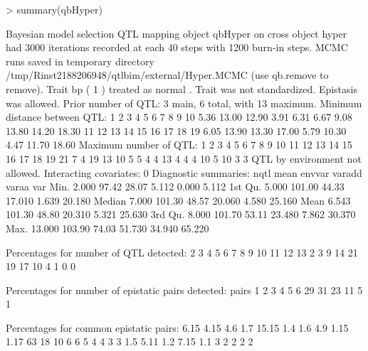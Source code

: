 \documentclass{article}
\begin{document}
\begin{Schunk}
\begin{Sinput}
> summary(qbHyper)
\end{Sinput}
\begin{Soutput}
Bayesian model selection QTL mapping object qbHyper on cross object hyper 
had 3000 iterations recorded at each 40 steps
with 1200 burn-in steps.
MCMC runs saved in temporary directory
 /tmp/Rinst2188206948/qtlbim/external/Hyper.MCMC 
(use qb.remove to remove).
Trait bp ( 1 ) treated as normal .
Trait was not standardized.
Epistasis was allowed.
Prior number of QTL: 3 main, 6 total, with 13 maximum.
Minimum distance between QTL:
    1     2     3     4     5     6     7     8     9    10 
 5.36 13.00 12.90  3.91  6.31  6.67  9.08 13.80 14.20 18.30 
   11    12    13    14    15    16    17    18    19 
 6.05 13.90 13.30 17.00  5.79 10.30  4.47 11.70 18.60 
Maximum number of QTL:
 1  2  3  4  5  6  7  8  9 10 11 12 13 14 15 16 17 18 19 
21  7  4 19 13 10  5  5  4  4 13  4  4  4 10  5 10  3  3 
QTL by environment not allowed.
Interacting covariates: 0
Diagnostic summaries:
          nqtl   mean envvar varadd  varaa    var
Min.     2.000  97.42  28.07  5.112  0.000  5.112
1st Qu.  5.000 101.00  44.33 17.010  1.639 20.180
Median   7.000 101.30  48.57 20.060  4.580 25.160
Mean     6.543 101.30  48.80 20.310  5.321 25.630
3rd Qu.  8.000 101.70  53.11 23.480  7.862 30.370
Max.    13.000 103.90  74.03 51.730 34.940 65.220

Percentages for number of QTL detected:
 2  3  4  5  6  7  8  9 10 11 12 13 
 2  3  9 14 21 19 17 10  4  1  0  0 

Percentages for number of epistatic pairs detected:
pairs
 1  2  3  4  5  6 
29 31 23 11  5  1 

Percentages for common epistatic pairs:
 6.15  4.15   4.6   1.7 15.15   1.4   1.6   4.9  1.15  1.17 
   63    18    10     6     6     5     4     4     3     3 
  1.5  5.11   1.2  7.15   1.1 
    3     2     2     2     2 
\end{Soutput}
\end{Schunk}
\end{document}
